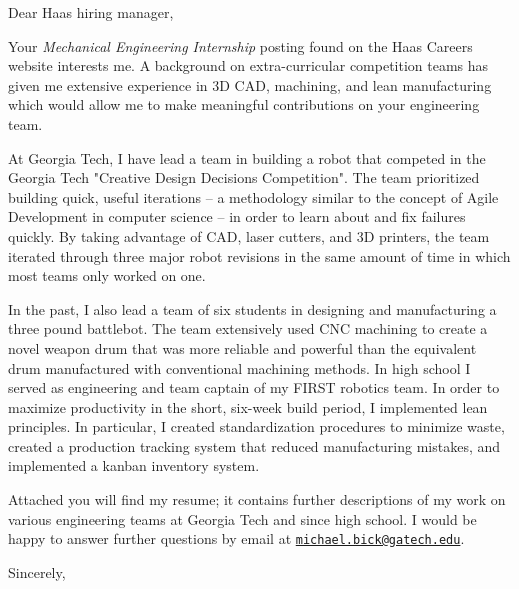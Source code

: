 \documentclass[12pt]{cover_letter}
\date{February 2, 2019}
\begin{document}
  \begin{letter}{}

    \opening{Dear Haas hiring manager,}

    \thispagestyle{fancy}

    Your \textit{Mechanical Engineering Internship} posting found on the Haas Careers website interests me. A background on extra-curricular competition teams has given me extensive experience in 3D CAD, machining, and lean manufacturing which would allow me to make meaningful contributions on your engineering team.

    At Georgia Tech, I have lead a team in building a robot that competed in the Georgia Tech "Creative Design Decisions Competition". The team prioritized building quick, useful iterations -- a methodology similar to the concept of Agile Development in computer science -- in order to learn about and fix failures quickly. By taking advantage of CAD, laser cutters, and 3D printers, the team iterated through three major robot revisions in the same amount of time in which most teams only worked on one.

    In the past, I also lead a team of six students in designing and manufacturing a three pound battlebot. The team extensively used CNC machining to create a novel weapon drum that was more reliable and powerful than the equivalent drum manufactured with conventional machining methods. In high school I served as engineering and team captain of my FIRST robotics team. In order to maximize productivity in the short, six-week build period, I implemented lean principles. In particular, I created standardization procedures to minimize waste, created a production tracking system that reduced manufacturing mistakes, and implemented a kanban inventory system.

    Attached you will find my resume; it contains further descriptions of my work on various engineering teams at Georgia Tech and since high school. I would be happy to answer further questions by email at \href{mailto:michael.bick@gatech.edu}{\nolinkurl{michael.bick@gatech.edu}}.

    \closing{Sincerely,}

  \end{letter}
\end{document}
